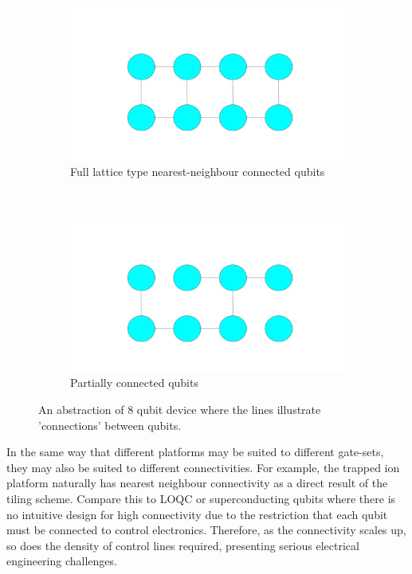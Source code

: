 \begin{figure}[H]
    \centering
\begin{subfigure}[h]{0.49\textwidth}
    \centering
    \includegraphics[width=\textwidth]{figures/impl/nearestneighbourcon.png}
    \caption{Full lattice type nearest-neighbour connected qubits}
    \label{fig:fullconnectivity}
\end{subfigure}
~
\begin{subfigure}[h]{0.49\textwidth}
    \centering
    \includegraphics[width=\textwidth]{figures/impl/partialnearestneighbourcon.png}
    \caption{Partially connected qubits}
    \label{fig:partialconnectivity}
\end{subfigure}
\caption{An abstraction of 8 qubit device where the lines illustrate 'connections' between qubits.}
\label{fig:connectivity}
\end{figure}

In the same way that different platforms may be suited to different gate-sets, they may also be suited to different connectivities. For example, the trapped ion platform naturally has nearest neighbour connectivity as a direct result of the tiling scheme. Compare this to LOQC or superconducting qubits where there is no intuitive design for high connectivity due to the restriction that each qubit must be connected to control electronics. Therefore, as the connectivity scales up, so does the density of control lines required, presenting serious electrical engineering challenges.


